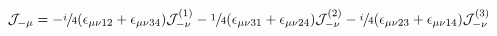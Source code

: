 \begin{equation}
 \mathcal{J}_{-\mu}=-\sfrac{i}{4}(\epsilon_{\mu\nu12}+
         \epsilon_{\mu\nu34})\mathcal{J}_{-\nu}^{(1)}
                - \sfrac{1}{4}(\epsilon_{\mu\nu31}+
         \epsilon_{\mu\nu24})\mathcal{J}_{-\nu}^{(2)}
                - \sfrac{i}{4}(\epsilon_{\mu\nu23}+
         \epsilon_{\mu\nu14})\mathcal{J}_{-\nu}^{(3)}
\end{equation}

